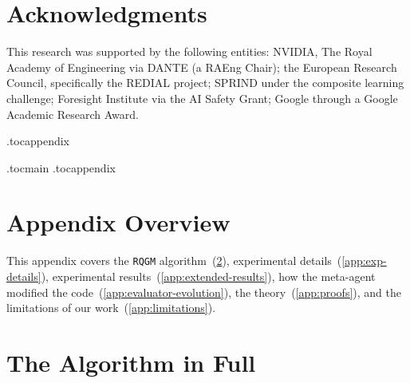\documentclass{paper}
\newcommand{\ourmethod}{\texttt{RQGM}\xspace}
\begin{document}
\section*{Acknowledgments}

This research was supported by the following entities: NVIDIA, The Royal Academy of Engineering via DANTE (a RAEng Chair); the European Research Council, specifically the REDIAL project; SPRIND under the composite learning challenge; Foresight Institute via the AI Safety Grant; Google through a Google Academic Research Award.


\FloatBarrier



\clearpage
\appendix
{}
\etocdepthtag.toc{appendix}

\clearpage
\raggedbottom
{}
\label{sec:appendix}
\etocdepthtag.toc{main}
\etocdepthtag.toc{appendix}

\vspace{0.8cm}
\begingroup
  \hypersetup{linkcolor=black}
  \color{black}
  \tableofcontents
\endgroup
\vspace{0.8\baselineskip}

\section{Appendix Overview}
This appendix covers the \ourmethod algorithm~(\cref{app:algo}), experimental details~(\cref{app:exp-details}), experimental results~(\cref{app:extended-results}), how the meta-agent modified the code~(\cref{app:evaluator-evolution}), the theory~(\cref{app:proofs}), and the limitations of our work~(\cref{app:limitations}).


\section{The Algorithm in Full}
\label{app:algo}
\end{document}

